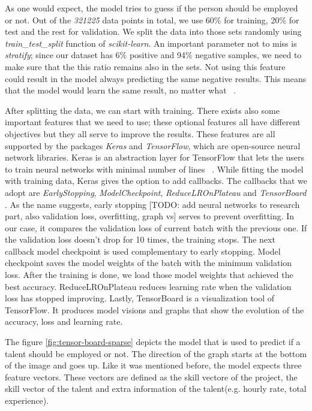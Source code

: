 As one would expect, the model tries to guess if the person should be employed or not. Out of the \textit{321225} data points in total, we use 60\% for training, 20\% for test and the rest for validation. We split the data into those sets randomly using \textit{train\_test\_split} function of \textit{scikit-learn}. An important parameter not to miss is \textit{stratify}; since our dataset has  6\% positive and 94\% negative samples, we need to make sure that the this ratio remains also in the sets. Not using this feature could result in the model always predicting the same negative results. This means that the model would learn the same result, no matter what ~\parencite{singh2015survey}.

After splitting the data, we can start with training. There exists also some important features that we need to use; these optional features all have different objectives but they all serve to improve the results. These features are all supported by the packages \textit{Keras} and \textit{TensorFlow}, which are open-source neural network libraries. Keras is an abstraction layer for TensorFlow that lets the users to train neural networks with minimal number of lines ~\parencite{chollet2018deep}. While fitting the model with training data, Keras gives the option to add callbacks. The callbacks that we adopt are \textit{EarlyStopping}, \textit{ModelCheckpoint},  \textit{ReduceLROnPlateau} and \textit{TensorBoard} . As the name suggests, early stopping [TODO: add neural networks to research part, also validation loss, overfitting, graph vs] serves to prevent overfitting. In our case, it compares the validation loss of current batch with the previous one. If the validation loss doesn't drop for 10 times, the training stops. The next callback model checkpoint is used complementary to early stopping. Model checkpoint saves the model weights of the batch with the minimum validation loss. After the training is done, we load those model weights that achieved the best accuracy. ReduceLROnPlateau reduces learning rate when the validation loss has stopped improving. Lastly, TensorBoard is a visualization tool of TensorFlow. It produces model visions and graphs that show the evolution of the accuracy, loss and learning rate.


The figure \ref{fig:tensor-board-sparse}  depicts the model that is used to predict if a talent should be employed or not. The direction of the graph starts at the bottom of the image and goes up. Like it was mentioned before, the model expects three feature vectors. These vectors are defined as the skill vectore of the project, the skill vector of the talent and extra information of the talent(e.g. hourly rate, total experience). 

